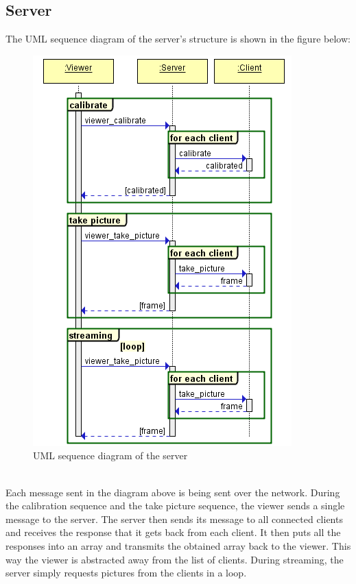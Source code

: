 \documentclass{article}
\begin{document}
\subsection{Server}
The UML sequence diagram of the server's structure is shown in the figure below:
\begin{figure}[h]
  \centering
  \includegraphics[scale=0.6]{serverUML}
  \caption{UML sequence diagram of the server}
\end{figure}
\\
Each message sent in the diagram above is being sent over the network. During the calibration sequence and the take picture sequence, the viewer sends a single message to the server. The server then sends its message to all connected clients and receives the response that it gets back from each client. It then puts all the responses into an array and transmits the obtained array back to the viewer. This way the viewer is abstracted away from the list of clients. During streaming, the server simply requests pictures from the clients in a loop.
\end{document}

